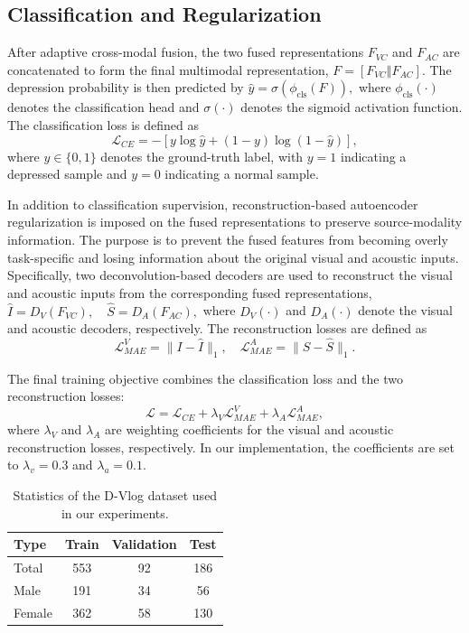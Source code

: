 \documentclass[a4paper,fleqn]{cas-dc}
\begin{document}
\subsection{Classification and Regularization}
After adaptive cross-modal fusion, the two fused representations $F_{VC}$ and $F_{AC}$ are concatenated to form the final multimodal representation, $F = [F_{VC} \Vert F_{AC}].$
The depression probability is then predicted by $\hat{y} = \sigma(\phi_{\mathrm{cls}}(F)),$
where $\phi_{\mathrm{cls}}(\cdot)$ denotes the classification head and $\sigma(\cdot)$ denotes the sigmoid activation function. The classification loss is defined as
\begin{equation}
\mathcal{L}_{CE}
=
-\left[
y\log\hat{y}
+
(1-y)\log(1-\hat{y})
\right],
\end{equation}
where $y\in\{0,1\}$ denotes the ground-truth label, with $y=1$ indicating a depressed sample and $y=0$ indicating a normal sample.

In addition to classification supervision, reconstruction-based autoencoder regularization is imposed on the fused representations to preserve source-modality information. The purpose is to prevent the fused features from becoming overly task-specific and losing information about the original visual and acoustic inputs. Specifically, two deconvolution-based decoders are used to reconstruct the visual and acoustic inputs from the corresponding fused representations, $\hat{I}=D_V(F_{VC}), \quad \hat{S}=D_A(F_{AC}),$
where $D_V(\cdot)$ and $D_A(\cdot)$ denote the visual and acoustic decoders, respectively. The reconstruction losses are defined as
\begin{equation}
\mathcal{L}_{MAE}^{V} = \|I-\hat{I}\|_1, 
\quad
\mathcal{L}_{MAE}^{A} = \|S-\hat{S}\|_1.
\end{equation}

The final training objective combines the classification loss and the two reconstruction losses:
\begin{equation}
\mathcal{L}
=
\mathcal{L}_{CE}
+
\lambda_V \mathcal{L}_{MAE}^{V}
+
\lambda_A \mathcal{L}_{MAE}^{A},
\end{equation}
where $\lambda_V$ and $\lambda_A$ are weighting coefficients for the visual and acoustic reconstruction losses, respectively. In our implementation, the coefficients are set to $\lambda_v = 0.3$ and $\lambda_a = 0.1$.


\begin{table}[htbp]
\centering
\caption{Statistics of the D-Vlog dataset used in our experiments.}
\label{tab:d_vlog_stats}
\begin{tabular}{lccc}
\toprule
Type      & Train & Validation & Test \\
\midrule
Total     & 553   & 92         & 186 \\
Male      & 191   & 34         & 56  \\
Female    & 362   & 58         & 130 \\
\bottomrule
\end{tabular}
\end{table}
\end{document}
